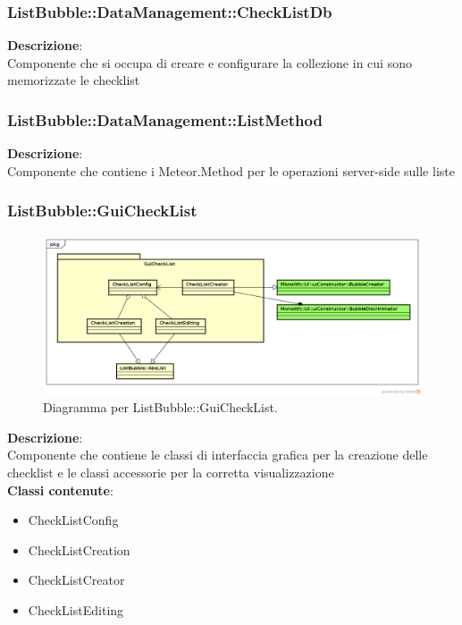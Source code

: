 \clearpage

\subsubsection{ListBubble::DataManagement::CheckListDb}
\textbf{Descrizione}:\\
 Componente che si occupa di creare e configurare la collezione in cui sono memorizzate le checklist 


\clearpage

\subsubsection{ListBubble::DataManagement::ListMethod}
\textbf{Descrizione}:\\
 Componente che contiene i Meteor.Method per le operazioni server-side sulle liste 


\clearpage

\subsubsection{ListBubble::GuiCheckList}
   \FloatBarrier
   \begin{figure}[ht]
   \centering
\includegraphics[width=\textwidth,keepaspectratio]{img/ListGuiCheckList}
   \caption{Diagramma per ListBubble::GuiCheckList.}
\end{figure}
\FloatBarrier
\textbf{Descrizione}:\\
 Componente che contiene le classi di interfaccia grafica per la creazione delle checklist e le classi accessorie per la corretta visualizzazione 
\\ \textbf{Classi contenute}:\\
\begin{itemize}
\item CheckListConfig
\item CheckListCreation
\item CheckListCreator
\item CheckListEditing
\end{itemize}


